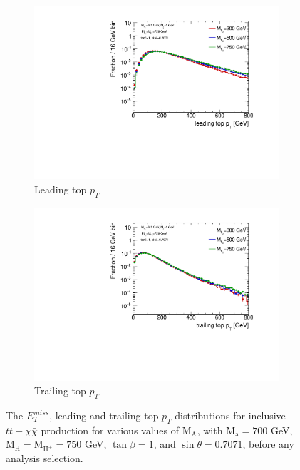 \begin{figure}
  \begin{subfigure}[b]{0.45\textwidth}
    \includegraphics[width=\textwidth]{texinputs/04_grid/figures/DMHF/benchmarking/MDM_1_Ma_700_sinp_0.7071_tanb_1.0_SCAN_MA/top1ptlog.pdf}
    \caption{Leading top $p_{T}$}
  \end{subfigure}
  \begin{subfigure}[b]{0.45\textwidth}
    \includegraphics[width=\textwidth]{texinputs/04_grid/figures/DMHF/benchmarking/MDM_1_Ma_700_sinp_0.7071_tanb_1.0_SCAN_MA/top2ptlog.pdf}
    \caption{Trailing top $p_{T}$}
  \end{subfigure}
  
  \caption{The $E_{T}^{miss}$, leading and trailing top $p_{T}$ distributions for inclusive $t\bar{t}+\chi\bar{\chi}$ production for various values of $\mathrm{M_A}$, with $\mathrm{M_a}=700$ GeV, $\mathrm{M_H}=\mathrm{M_{H^{\pm}}}=750$ GeV, $\tan\beta=1$, and $\sin\theta=0.7071$, before any analysis selection.\label{fig:kin_MA}}
 
\end{figure}

